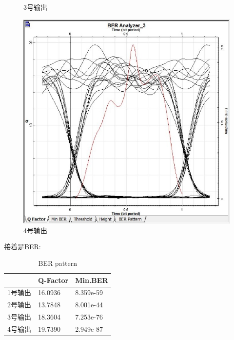 \documentclass[12pt, a4paper, oneside]{article}
\begin{document}
\begin{spacing}{2.0}
\begin{figure}[H]
\begin{minipage}[t]{0.5\linewidth}
        \caption{3号输出}
        \label{fig:side:a}
      \end{minipage}%
      \begin{minipage}[t]{0.5\linewidth}
        \centering
        \includegraphics[scale=0.5]{Q-factor (4).jpg}
        \caption{4号输出}
        \label{fig:side:b}
      \end{minipage}
\end{figure}

接着是BER:
\begin{table}[H]
  \centering
  \caption{BER pattern}
  \begin{tabular}{|l|l|l|} 
  \hline
    & Q-Factor & Min.BER    \\ 
  \hline
  1号输出 & 16.0936  & 8.359e-59  \\ 
  \hline
  2号输出 & 13.7848  & 8.001e-44  \\ 
  \hline
  3号输出 & 18.3604  & 7.253e-76  \\ 
  \hline
  4号输出 & 19.7390  & 2.949e-87  \\
  \hline
  \end{tabular}
  \end{table}


\end{spacing}
\end{document}
